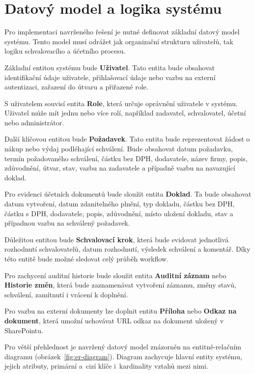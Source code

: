 \section{Datový model a logika systému}

Pro implementaci navrženého řešení je nutné definovat základní datový model systému. Tento model musí odrážet jak organizační strukturu uživatelů, tak logiku schvalovacího a účetního procesu.

Základní entitou systému bude \textbf{Uživatel}. Tato entita bude obsahovat identifikační údaje uživatele, přihlašovací údaje nebo vazbu na externí autentizaci, zařazení do útvaru a přiřazené role.

S uživatelem souvisí entita \textbf{Role}, která určuje oprávnění uživatele v systému. Uživatel může mít jednu nebo více rolí, například zadavatel, schvalovatel, účetní nebo administrátor.

Další klíčovou entitou bude \textbf{Požadavek}. Tato entita bude reprezentovat žádost o nákup nebo výdaj podléhající schválení. Bude obsahovat datum požadavku, termín požadovaného schválení, částku bez DPH, dodavatele, název firmy, popis, zdůvodnění, útvar, stav, vazbu na zadavatele a případně vazbu na navazující doklad.

Pro evidenci účetních dokumentů bude sloužit entita \textbf{Doklad}. Ta bude obsahovat datum vytvoření, datum zdanitelného plnění, typ dokladu, částku bez DPH, částku s DPH, dodavatele, popis, zdůvodnění, místo uložení dokladu, stav a případnou vazbu na schválený požadavek.

Důležitou entitou bude \textbf{Schvalovací krok}, která bude evidovat jednotlivá rozhodnutí schvalovatelů, datum rozhodnutí, výsledek schválení a komentář. Díky této entitě bude možné sledovat celý průběh workflow.

Pro zachycení auditní historie bude sloužit entita \textbf{Auditní záznam} nebo \textbf{Historie změn}, která bude zaznamenávat vytvoření záznamu, změny stavů, schválení, zamítnutí i vrácení k doplnění.

Pro vazbu na externí dokumenty lze doplnit entitu \textbf{Příloha} nebo \textbf{Odkaz na dokument}, která umožní uchovávat URL odkaz na dokument uložený v SharePointu.

Pro větší přehlednost je navržený datový model znázorněn na entitně-relačním diagramu (obrázek~\ref{fig:er-diagram}). Diagram zachycuje hlavní entity systému, jejich atributy, primární a~cizí klíče i~kardinality vztahů mezi nimi.

